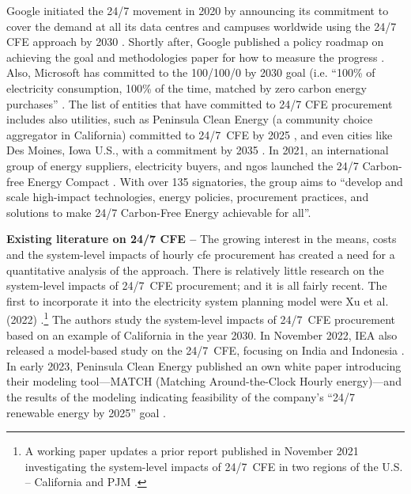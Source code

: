 \documentclass[11pt, 5p, nopreprintline]{elsarticle}
\begin{document}
Google initiated the 24/7 movement in 2020 by announcing its commitment to cover the demand at all its data centres and campuses worldwide using the 24/7 CFE approach by 2030 \cite{google-247by2030}.
Shortly after, Google published a policy roadmap on achieving the goal \cite{google-PolicyRoadmap} and methodologies paper for how to measure the progress \cite{google-methodologies}.
Also, Microsoft has committed to the 100/100/0 by 2030 goal (i.e. \enquote{100\% of electricity consumption, 100\% of the time, matched by zero carbon energy purchases} \cite{Microsoft-vision}.
The list of entities that have committed to 24/7 CFE procurement includes also utilities, such as Peninsula Clean Energy (a community choice aggregator in California) committed to 24/7~CFE by 2025 \cite{peninsula-OurPathto247}, and even cities like Des Moines, Iowa U.S., with a commitment by 2035 \cite{iowaenvcouncil-247}. In 2021, an international group of energy suppliers, electricity buyers, and \gls{ngo}s launched the 24/7 Carbon-free Energy Compact \cite{gocarbonfree247}.
With over 135 signatories, the group aims to \enquote{develop and scale high-impact technologies, energy policies, procurement practices, and solutions to make 24/7 Carbon-Free Energy achievable for all}.


\textbf{Existing literature on 24/7 CFE --} The growing interest in the means, costs and the system-level impacts of hourly \gls{cfe} procurement has created a need for a quantitative analysis of the approach.
There is relatively little research on the system-level impacts of 24/7~CFE procurement; and it is all fairly recent.
The first to incorporate it into the electricity system planning model were Xu et al. (2022) \cite{xu-247CFE-SSRN}.\footnote{A working paper updates a prior report published in November 2021 investigating the system-level impacts of 24/7~CFE in two regions of the U.S. -- California and PJM \cite{xu-247CFE-report}.}
The authors study the system-level impacts of 24/7~CFE procurement based on an example of California in the year 2030.
In November 2022, IEA also released a model-based study on the 24/7~CFE, focusing on India and Indonesia \cite{ieaAdvancingDecarbonisationClean2022}.
In early 2023, Peninsula Clean Energy published an own white paper introducing their modeling tool---MATCH (Matching Around-the-Clock Hourly energy)---and the results of the modeling indicating feasibility of the company's \enquote{24/7 renewable energy by 2025} goal \cite{peninsula-report247}.
\end{document}
